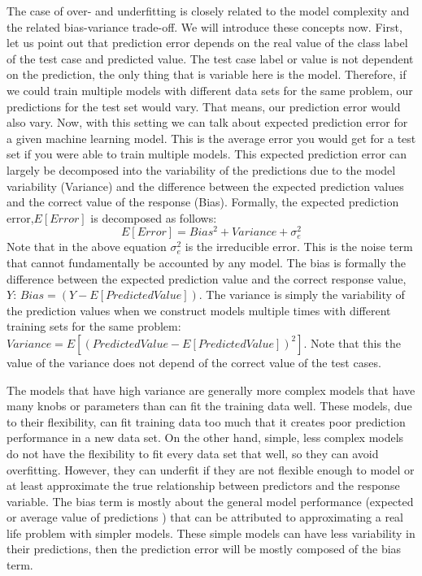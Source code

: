 \documentclass[12pt,]{krantz}
\begin{document}
The case of over- and underfitting is closely related to the model complexity and the related bias-variance trade-off. We will introduce these concepts now. First, let us point out that prediction error depends on the real value of the class label of the test case and predicted value. The test case label or value is not dependent on the prediction, the only thing that is variable here is the model. Therefore, if we could train multiple models with different data sets for the same problem, our predictions for the test set would vary. That means, our prediction error would also vary. Now, with this setting we can talk about expected prediction error for a given machine learning model. This is the average error you would get for a test set if you were able to train multiple models. This expected prediction error can largely be decomposed into the variability of the predictions due to the model variability (Variance) and the difference between the expected prediction values and the correct value of the response (Bias). Formally, the expected prediction error,\(E[Error]\) is decomposed as follows:
\[
 E[Error]=Bias^2 + Variance + \sigma_e^2
\]
Note that in the above equation \(\sigma_e^2\) is the irreducible error. This is the noise term that cannot fundamentally be accounted by any model. The bias is formally the difference between the expected prediction value and the correct response value, \(Y\): \(Bias=(Y-E[PredictedValue])\). The variance is simply the variability of the prediction values when we construct models multiple times with different training sets for the same problem: \(Variance=E[(PredictedValue-E[PredictedValue])^2]\). Note that this the value of the variance does not depend of the correct value of the test cases.

The models that have high variance are generally more complex models that have many knobs or parameters than can fit the training data well. These models, due to their flexibility, can fit training data too much that it creates poor prediction performance in a new data set. On the other hand, simple, less complex models do not have the flexibility to fit every data set that well, so they can avoid overfitting. However, they can underfit if they are not flexible enough to model or at least approximate the true relationship between predictors and the response variable. The bias term is mostly about the general model performance (expected or average value of predictions ) that can be attributed to approximating a real life problem with simpler models. These simple models can have less variability in their predictions, then the prediction error will be mostly composed of the bias term.
\end{document}
